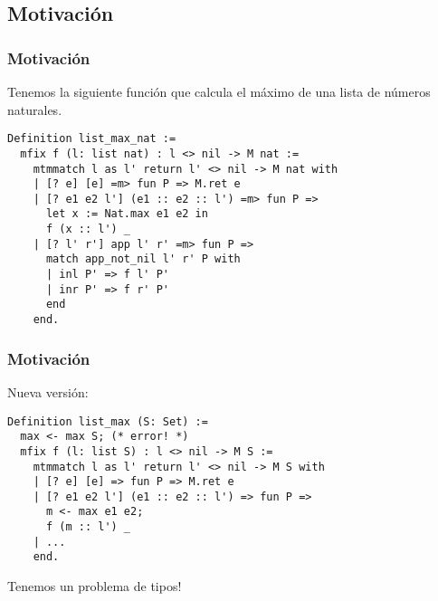 \documentclass{beamer}
\begin{document}
\begin{frame}[fragile]
\section{Motivación}
\frametitle{Motivación}

Tenemos la siguiente función que calcula el máximo de una lista de números naturales.
\begin{lstlisting}
Definition list_max_nat :=
  mfix f (l: list nat) : l <> nil -> M nat :=
    mtmmatch l as l' return l' <> nil -> M nat with
    | [? e] [e] =m> fun P => M.ret e
    | [? e1 e2 l'] (e1 :: e2 :: l') =m> fun P =>
      let x := Nat.max e1 e2 in
      f (x :: l') _
    | [? l' r'] app l' r' =m> fun P =>
      match app_not_nil l' r' P with
      | inl P' => f l' P'
      | inr P' => f r' P'
      end
    end.
\end{lstlisting}

\end{frame}


\begin{frame}[fragile]
\frametitle{Motivación}

Nueva versión:
\begin{lstlisting}
Definition list_max (S: Set) :=
  max <- max S; (* error! *)
  mfix f (l: list S) : l <> nil -> M S :=
    mtmmatch l as l' return l' <> nil -> M S with
    | [? e] [e] => fun P => M.ret e
    | [? e1 e2 l'] (e1 :: e2 :: l') => fun P =>
      m <- max e1 e2;
      f (m :: l') _
    | ...
    end.
\end{lstlisting}

Tenemos un problema de tipos!
\end{frame}
\end{document}
